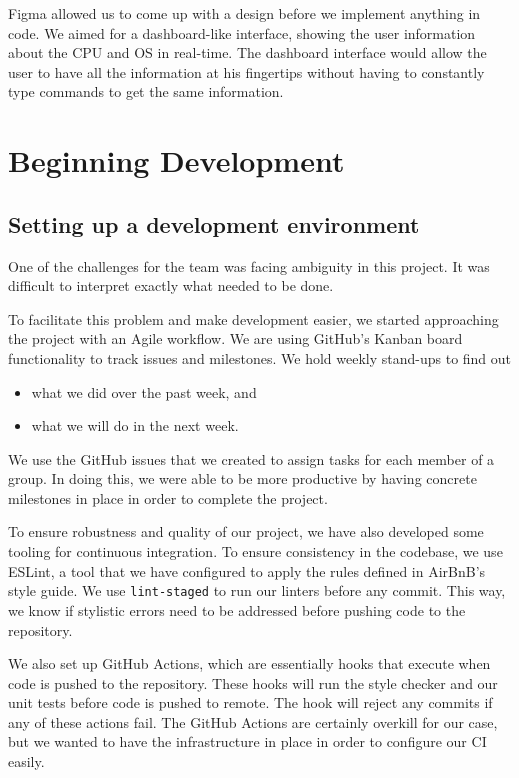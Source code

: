 Figma allowed us to come up with a design before we implement anything in code.
We aimed for a dashboard-like interface, showing the user
information about the CPU and OS in real-time. The dashboard interface would
allow the user to have all the information at his fingertips without
having to constantly type commands to get the same information.

\section{Beginning Development}

\subsection*{Setting up a development environment}

One of the challenges for the team was facing ambiguity in this project.
It was difficult to interpret exactly what needed to be done.

To facilitate this problem and make development easier,
we started approaching the project with an Agile workflow.
We are using GitHub's Kanban board functionality to track issues and milestones.
We hold weekly stand-ups to find out

\begin{itemize}
  \item what we did over the past week, and
  \item what we will do in the next week.
\end{itemize}

\noindent
We use the GitHub issues that we created to assign tasks for each member of a group.
In doing this, we were able to be more productive by having concrete milestones in place
in order to complete the project.

To ensure robustness and quality of our project,
we have also developed some tooling for continuous integration.
To ensure consistency in the codebase, we use ESLint, a tool that we have configured
to apply the rules defined in AirBnB's style guide.
We use \texttt{lint-staged} to run our linters before any commit. This way,
we know if stylistic errors need to be addressed before pushing code to the repository.

We also set up GitHub Actions, which are essentially hooks that execute when
code is pushed to the repository.
These hooks will run the style checker and our unit tests before code is pushed to remote.
The hook will reject any commits if any of these actions fail.
The GitHub Actions are certainly overkill for our case, but we wanted to have the infrastructure
in place in order to configure our CI easily.

